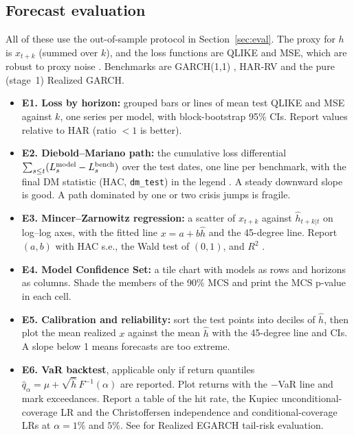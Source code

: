 \documentclass[11pt]{article}
\begin{document}
\subsection{Forecast evaluation}\label{sec:figs-fc}
All of these use the out-of-sample protocol in Section~\ref{sec:eval}. The proxy for $h$ is $x_{t+k}$
(summed over $k$), and the loss functions are QLIKE and MSE, which are robust to proxy noise \cite{Patton2011}.
Benchmarks are GARCH(1,1) \cite{Bollerslev1986}, HAR-RV \cite{Corsi2009} and the pure (stage~1) Realized GARCH.
\begin{itemize}
\item \textbf{E1. Loss by horizon:} grouped bars or lines of mean test QLIKE and MSE against $k$, one series per
model, with block-bootstrap 95\% CIs. Report values relative to HAR (ratio $<1$ is better).
\item \textbf{E2. Diebold--Mariano path:} the cumulative loss differential $\sum_{s\le t}(L^{\rm model}_s-L^{\rm bench}_s)$
over the test dates, one line per benchmark, with the final DM statistic (HAC, \texttt{dm\_test}) in the legend
\cite{DM1995}. A steady downward slope is good. A path dominated by one or two crisis jumps is fragile.
\item \textbf{E3. Mincer--Zarnowitz regression:} a scatter of $x_{t+k}$ against $\hat h_{t+k|t}$ on log--log axes,
with the fitted line $x=a+b\hat h$ and the 45-degree line. Report $(a,b)$ with HAC s.e., the Wald test of $(0,1)$, and $R^2$ \cite{MZ1969}.
\item \textbf{E4. Model Confidence Set:} a tile chart with models as rows and horizons as columns. Shade the members of the 90\% MCS
\cite{HLN2011} and print the MCS p-value in each cell.
\item \textbf{E5. Calibration and reliability:} sort the test points into deciles of $\hat h$, then plot the mean realized $x$
against the mean $\hat h$ with the 45-degree line and CIs. A slope below 1 means forecasts are too extreme.
\item \textbf{E6. VaR backtest}, applicable only if return quantiles $\hat q_\alpha=\mu+\sqrt{\hat h}\,F^{-1}(\alpha)$ are reported.
Plot returns with the $-$VaR line and mark exceedances. Report a table of the hit rate, the Kupiec unconditional-coverage
LR \cite{Kupiec1995} and the Christoffersen independence and conditional-coverage LRs \cite{Christoffersen1998}
at $\alpha=1\%$ and $5\%$. See \cite{Tendenan2020} for Realized EGARCH tail-risk evaluation.
\end{itemize}
\end{document}
